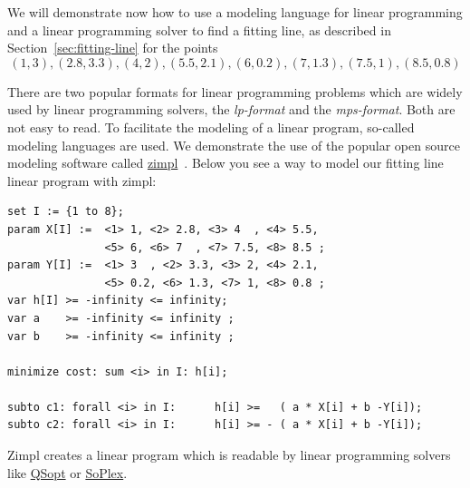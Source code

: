 We will demonstrate now how to use a modeling language for linear
programming and a linear programming solver to find a fitting line, as
described in Section~\ref{sec:fitting-line} for the points 
\begin{displaymath}
   (1,3), (2.8,3.3),(4,2),(5.5,2.1),(6,0.2), (7,1.3), (7.5,1), (8.5,0.8) 
\end{displaymath}

There are two popular formats for linear programming problems which
are widely used by linear programming solvers, the \emph{lp-format}
and the \emph{mps-format}. Both are not easy to read. To facilitate
the modeling of a linear program, so-called modeling languages are
used. We demonstrate the use of the popular open source modeling
software called
\href{http://www.zib.de/koch/zimpl}{zimpl}~\cite{Koch2004}. Below you
see a way to model our fitting line linear program with zimpl:

{\small 
\begin{verbatim}
set I := {1 to 8};
param X[I] :=  <1> 1, <2> 2.8, <3> 4  , <4> 5.5, 
               <5> 6, <6> 7  , <7> 7.5, <8> 8.5 ;
param Y[I] :=  <1> 3  , <2> 3.3, <3> 2, <4> 2.1, 
               <5> 0.2, <6> 1.3, <7> 1, <8> 0.8 ;
var h[I] >= -infinity <= infinity;
var a    >= -infinity <= infinity ;
var b    >= -infinity <= infinity ;

minimize cost: sum <i> in I: h[i];

subto c1: forall <i> in I:      h[i] >=   ( a * X[i] + b -Y[i]);
subto c2: forall <i> in I:      h[i] >= - ( a * X[i] + b -Y[i]);
\end{verbatim}
}
%
\noindent
Zimpl  creates a linear program which is readable by linear
programming solvers like
\href{http://www2.isye.gatech.edu/~wcook/qsopt}{QSopt} or
\href{http://soplex.zib.de/}{SoPlex}. %

    
      



